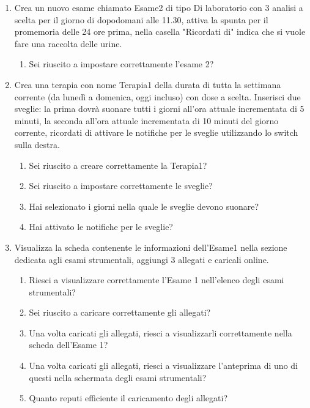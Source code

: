 \documentclass[12pt,a4paper,openright,twoside]{report}
\begin{document}
\begin{enumerate}
    \item Crea un nuovo esame chiamato Esame2 di tipo Di laboratorio con 3 analisi a scelta per il giorno di dopodomani alle 11.30, attiva la spunta per il promemoria delle 24 ore prima, nella casella "Ricordati di" indica che si vuole fare una raccolta delle urine.
    \begin{enumerate}
        \item Sei riuscito a impostare correttamente l'esame 2?
    \end{enumerate}
    
    \item Crea una terapia con nome Terapia1 della durata di tutta la settimana corrente (da lunedì a domenica, oggi incluso) con dose a scelta. Inserisci due sveglie: la prima dovrà suonare tutti i giorni all'ora attuale incrementata di 5 minuti, la seconda all'ora attuale incrementata di 10 minuti del giorno corrente, ricordati di attivare le notifiche per le sveglie utilizzando lo switch sulla destra.
    \begin{enumerate}
        \item Sei riuscito a creare correttamente la Terapia1?
        \item Sei riuscito a impostare correttamente le sveglie?
        \item Hai selezionato i giorni nella quale le sveglie devono suonare?
        \item Hai attivato le notifiche per le sveglie?
    \end{enumerate}
    
    \item Visualizza la scheda contenente le informazioni dell'Esame1 nella sezione dedicata agli esami strumentali, aggiungi 3 allegati e caricali online.
    \begin{enumerate}
        \item Riesci a visualizzare correttamente l'Esame 1 nell'elenco degli esami strumentali?
        \item Sei riuscito a caricare correttamente gli allegati?
        \item Una volta caricati gli allegati, riesci a visualizzarli correttamente nella scheda dell'Esame 1?
        \item Una volta caricati gli allegati, riesci a visualizzare l'anteprima di uno di questi nella schermata degli esami strumentali?
        \item Quanto reputi efficiente il caricamento degli allegati?
    \end{enumerate}
    

\end{enumerate}
\end{document}
